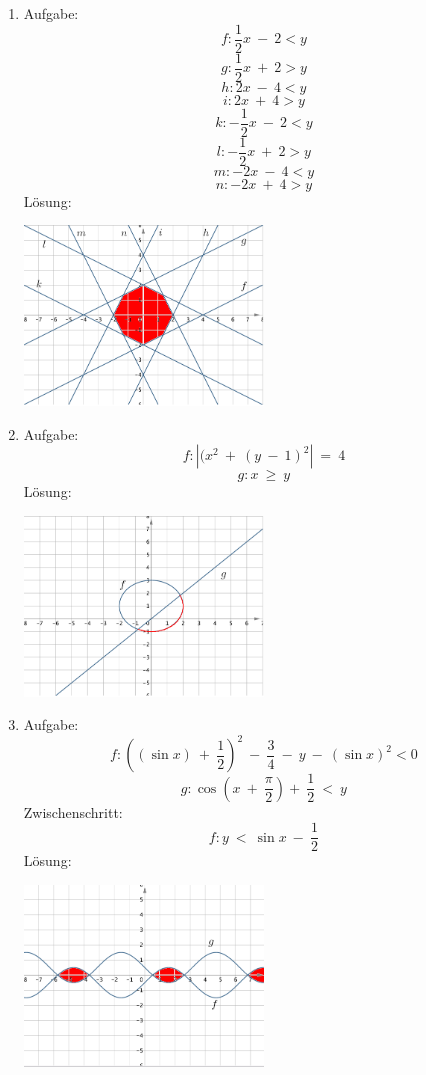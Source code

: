 \begin{enumerate}
\begin{center}
					\end{center}
	\item Aufgabe:
					\[f : \frac 1 2 x \ - \ 2 < y\]
					\[g : \frac 1 2 x \ + \ 2 > y\]
					\[h : 2 x \ - \ 4 < y\]
					\[i : 2 x \ + \ 4 > y\]
					\[k : - \frac 1 2 x \ - \ 2 < y\]
					\[l : - \frac 1 2 x \ + \ 2 > y\]
					\[m : -2 x \ - \ 4 < y\]
					\[n : -2 x \ + \ 4 > y\]
				L\"osung:
					\begin{center}
						\includegraphics[width=0.5\textwidth]{img/Aufgaben/Graphisch/A7.PNG}
					\end{center}
	\item Aufgabe:
					\[f : |(x^2 \ + \ (y \ - \ 1)^2| \ = \ 4 \]
					\[g : x \ \geq \ y \]
				L\"osung:
					\begin{center}
						\includegraphics[width=0.5\textwidth]{img/Aufgaben/Graphisch/A8.PNG}
					\end{center}
	\item Aufgabe:
					\[f : ((\sin x) \ + \ \frac 1 2)^2 \ - \ \frac 3 4 \ - \ y \ - \ (\sin x)^2 < 0\]
					\[g : \cos (x \ + \ \frac {\pi} 2 ) + \ \frac 1 2 \ < \ y \]
				Zwischenschritt:
					\[f : y \ < \ \sin x \ - \ \frac 1 2\]
				L\"osung:
					\begin{center}
						\includegraphics[width=0.5\textwidth]{img/Aufgaben/Graphisch/A9.PNG}

\end{center}
\end{enumerate}
